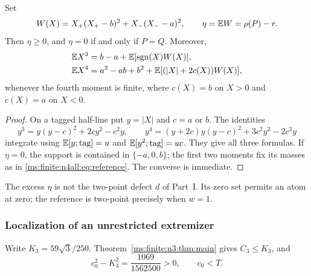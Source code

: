 \begin{lemma}\label{ms:finite:n4all:lem:excess}
Set
\[
 W(X)=X_+(X_+-b)^2+X_-(X_--a)^2,\qquad
 \eta=\mathbb E W=\rho(P)-r.
\]
Then $\eta\ge0$, and $\eta=0$ if and only if $P=Q$.
Moreover,
\begin{align}
 \mathbb E X^3&=b-a+\mathbb E[\operatorname{sgn}(X)W(X)],\notag\\
 \mathbb E X^4&=a^2-ab+b^2+
   \mathbb E[(|X|+2c(X))W(X)],\label{ms:finite:n4all:eq:physical-moments}
\end{align}
whenever the fourth moment is finite, where $c(X)=b$ on $X>0$ and
$c(X)=a$ on $X<0$.
\end{lemma}
\begin{proof}
On a tagged half-line put $y=|X|$ and $c=a$ or $b$. The identities
\[
 y^3=y(y-c)^2+2cy^2-c^2y,
 \qquad
 y^4=(y+2c)y(y-c)^2+3c^2y^2-2c^3y
\]
integrate using $\mathbb E[y;\text{tag}]=u$ and
$\mathbb E[y^2;\text{tag}]=uc$. They give all three formulas.
If $\eta=0$, the support is contained in $\{-a,0,b\}$; the first
two moments fix its masses as in \eqref{ms:finite:n4all:eq:reference}.
The converse is immediate.
\end{proof}

The excess $\eta$ is not the two-point defect $d$ of Part~I.
Its zero set permits an atom at zero; the reference is two-point
precisely when $w=1$.

\subsubsection{Localization of an unrestricted extremizer}
Write $K_3=59\sqrt3/250$. Theorem~\ref{ms:finite:n3:thm:main} gives
$C_3\le K_3$, and
\[
 c_0^2-K_3^2=\frac{1069}{1562500}>0,\qquad c_0<T.
\]


